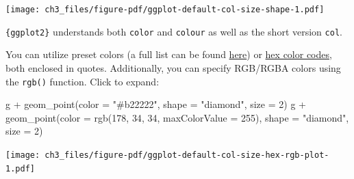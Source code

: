 \documentclass[
  letterpaper,
]{scrbook}
\newenvironment{Shaded}{\begin{snugshade}}{\end{snugshade}}
\newcommand{\AttributeTok}[1]{\textcolor[rgb]{0.40,0.45,0.13}{#1}}
\newcommand{\DecValTok}[1]{\textcolor[rgb]{0.68,0.00,0.00}{#1}}
\newcommand{\FunctionTok}[1]{\textcolor[rgb]{0.28,0.35,0.67}{#1}}
\newcommand{\NormalTok}[1]{\textcolor[rgb]{0.00,0.23,0.31}{#1}}
\newcommand{\SpecialCharTok}[1]{\textcolor[rgb]{0.37,0.37,0.37}{#1}}
\newcommand{\StringTok}[1]{\textcolor[rgb]{0.13,0.47,0.30}{#1}}
\begin{document}
\texttt{[image: ch3\_files/figure-pdf/ggplot-default-col-size-shape-1.pdf]}

\begin{tcolorbox}[enhanced jigsaw, toprule=.15mm, bottomtitle=1mm, coltitle=black, breakable, colbacktitle=quarto-callout-note-color!10!white, opacityback=0, toptitle=1mm, colframe=quarto-callout-note-color-frame, titlerule=0mm, title=\textcolor{quarto-callout-note-color}{\faInfo}\hspace{0.5em}{Color or Colour?}, bottomrule=.15mm, arc=.35mm, opacitybacktitle=0.6, leftrule=.75mm, left=2mm, rightrule=.15mm, colback=white]

\texttt{\{ggplot2\}} understands both \texttt{color} and \texttt{colour}
as well as the short version \texttt{col}.

\end{tcolorbox}

\begin{tcolorbox}[enhanced jigsaw, toprule=.15mm, bottomtitle=1mm, coltitle=black, breakable, colbacktitle=quarto-callout-tip-color!10!white, opacityback=0, toptitle=1mm, colframe=quarto-callout-tip-color-frame, titlerule=0mm, title=\textcolor{quarto-callout-tip-color}{\faLightbulb}\hspace{0.5em}{Color Presets 🎨}, bottomrule=.15mm, arc=.35mm, opacitybacktitle=0.6, leftrule=.75mm, left=2mm, rightrule=.15mm, colback=white]

You can utilize preset colors (a full list can be found
\href{http://www.stat.columbia.edu/~tzheng/files/Rcolor.pdf}{here}) or
\href{https://www.techopedia.com/definition/29788/color-hex-code}{hex
color codes}, both enclosed in quotes. Additionally, you can specify
RGB/RGBA colors using the \texttt{rgb()} function. Click to expand:

\begin{Shaded}
\begin{Highlighting}[]
\NormalTok{g }\SpecialCharTok{+} \FunctionTok{geom\_point}\NormalTok{(}\AttributeTok{color =} \StringTok{"\#b22222"}\NormalTok{, }\AttributeTok{shape =} \StringTok{"diamond"}\NormalTok{, }\AttributeTok{size =} \DecValTok{2}\NormalTok{)}
\NormalTok{g }\SpecialCharTok{+} \FunctionTok{geom\_point}\NormalTok{(}\AttributeTok{color =} \FunctionTok{rgb}\NormalTok{(}\DecValTok{178}\NormalTok{, }\DecValTok{34}\NormalTok{, }\DecValTok{34}\NormalTok{, }\AttributeTok{maxColorValue =} \DecValTok{255}\NormalTok{), }\AttributeTok{shape =} \StringTok{"diamond"}\NormalTok{, }\AttributeTok{size =} \DecValTok{2}\NormalTok{)}
\end{Highlighting}
\end{Shaded}

\texttt{[image: ch3\_files/figure-pdf/ggplot-default-col-size-hex-rgb-plot-1.pdf]}

\end{tcolorbox}
\end{document}
